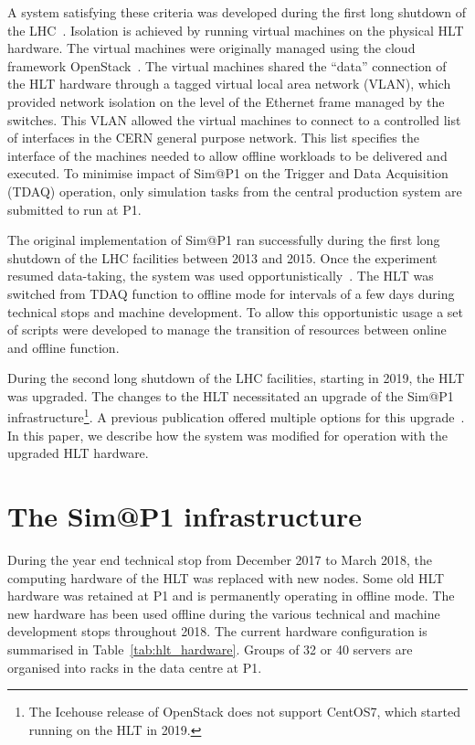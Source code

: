 \documentclass{webofc}
\begin{document}
A system satisfying these criteria was developed during the first long shutdown
of the LHC~\cite{Ballestrero:2015ypa}. Isolation is achieved by running virtual
machines on the physical HLT hardware. The virtual machines were originally
managed using the cloud framework OpenStack~\cite{openstack}. The virtual
machines shared the ``data'' connection of the HLT hardware through a tagged
virtual local area network (VLAN), which provided network isolation on the level
of the Ethernet frame managed by the switches. This VLAN allowed the virtual
machines to connect to a controlled list of interfaces in the CERN general
purpose network. This list specifies the interface of the machines needed to
allow offline workloads to be delivered and executed. To minimise impact of
Sim@P1 on the Trigger and Data Acquisition (TDAQ) operation, only simulation
tasks from the central production system are submitted to run at P1.

The original implementation of Sim@P1 ran successfully during the first long
shutdown of the LHC facilities between 2013 and 2015. Once the experiment
resumed data-taking, the system was used
opportunistically~\cite{Ballestrero:2017psv}. The HLT was switched from TDAQ
function to offline mode for intervals of a few days during technical stops and
machine development. To allow this opportunistic usage a set of scripts were
developed to manage the transition of resources between online and offline
function.

During the second long shutdown of the LHC facilities, starting in 2019, the HLT
was upgraded. The changes to the HLT necessitated an upgrade of the Sim@P1
infrastructure\footnote{The Icehouse release of OpenStack does not support
CentOS7, which started running on the HLT in 2019.}. A previous
publication offered multiple options for this upgrade~\cite{Berghaus:2019wuj}.
In this paper, we describe how the system was modified for operation with the
upgraded HLT hardware.

\section{The Sim@P1 infrastructure}\label{sec:infra}
During the year end technical stop from December 2017 to March 2018, the
computing hardware of the HLT was replaced with new nodes. Some old HLT hardware
was retained at P1 and is permanently operating in offline mode. The new
hardware has been used offline during the various technical and machine
development stops throughout 2018. The current hardware configuration is
summarised in Table~\ref{tab:hlt_hardware}. Groups of 32 or 40 servers are
organised into racks in the data centre at P1.
\end{document}
